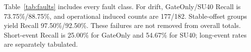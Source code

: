 Table~\ref{tab:faults} includes every fault class. For drift, GateOnly/SU40 Recall is 73.75\%/88.75\%, and operational induced counts are 177/182. Stable-offset groups yield Recall 97.50\%/92.50\%. These failures are not removed from overall totals. Short-event Recall is 25.00\% for GateOnly and 54.67\% for SU40; long-event rates are separately tabulated.
